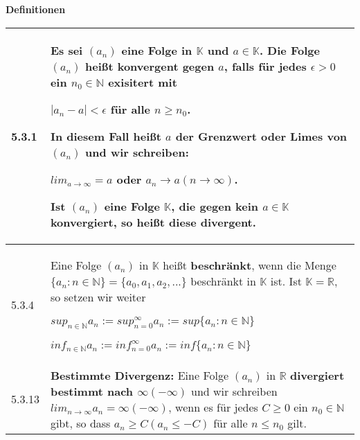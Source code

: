 \noindent
\textbf{Definitionen}
\begin{table}[H]  
\begin{tabularx}{\textwidth}{X m{16cm}}
    \toprule
    
    5.3.1 & Es sei $(a_n)$ eine Folge in $\mathbb{K}$ und $a \in \mathbb{K}$. Die Folge $(a_n)$ heißt \textbf{konvergent} gegen $a$,
            falls für jedes $\epsilon > 0$ ein $n_0 \in \mathbb{N}$ exisitert mit \hfill \break
            \centerline{$|a_n-a| < \epsilon$ für alle $n \geq n_0$.}
            In diesem Fall heißt $a$ der \textbf{Grenzwert} oder Limes von $(a_n)$ und wir schreiben: \hfill \break
            \centerline{$lim_{a \rightarrow \infty} = a$ oder $a_n \rightarrow a (n \rightarrow \infty)$.} 
            Ist $(a_n)$ eine Folge $\mathbb{K}$, die gegen kein $a \in \mathbb{K}$ konvergiert, so heißt diese \textbf{divergent}. \\
    \midrule
    5.3.4 & Eine Folge $(a_n)$ in $\mathbb{K}$ heißt \textbf{beschränkt}, wenn die Menge $\{a_n: n \in \mathbb{N}\} = \{a_0,a_1,a_2,...\}$
            beschränkt in $\mathbb{K}$ ist. \hfill \break
            Ist $\mathbb{K} = \mathbb{R}$, so setzen wir weiter \hfill \break
            \centerline{$sup_{n \in \mathbb{N}}a_n := sup^{\infty}_{n=0}a_n := sup\{a_n: n \in \mathbb{N}\}$} 
            \centerline{$inf_{n \in \mathbb{N}}a_n := inf^{\infty}_{n=0}a_n := inf\{a_n: n \in \mathbb{N}\}$} \\
    \midrule
    5.3.13& \textbf{Bestimmte Divergenz:} \hfill \break
            Eine Folge $(a_n)$ in $\mathbb{R}$ \textbf{divergiert bestimmt nach $\infty (- \infty)$} und wir schreiben
            $lim_{n \rightarrow \infty} a_n = \infty (-\infty)$, wenn es für jedes $C \geq 0$ ein $n_0 \in \mathbb{N}$ gibt, so dass
            $a_n \geq C (a_n \leq -C)$ für alle $n \leq n_0$ gilt. \\


    \bottomrule
    
\end{tabularx}
\end{table}

